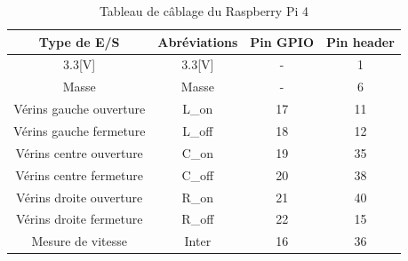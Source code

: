 \begin{table}[h]
    \begin{center}
        \caption{Tableau de câblage du Raspberry Pi 4}
        \begin{tabular}{|c|c|c|c|}
            Type de E/S             & Abréviations & Pin GPIO & Pin header \\ \hline
            3.3[V]                  & 3.3[V]       & -        & 1          \\
            Masse                   & Masse        & -        & 6          \\
            Vérins gauche ouverture & L\_on        & 17       & 11         \\
            Vérins gauche fermeture & L\_off       & 18       & 12         \\
            Vérins centre ouverture & C\_on        & 19       & 35         \\
            Vérins centre fermeture & C\_off       & 20       & 38         \\
            Vérins droite ouverture & R\_on        & 21       & 40         \\
            Vérins droite fermeture & R\_off       & 22       & 15         \\
            Mesure de vitesse       & Inter        & 16       & 36         \\
        \end{tabular}
    \end{center}
\end{table}